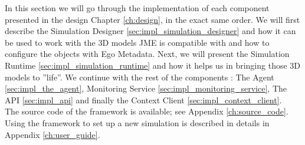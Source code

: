 In this section we will go through the implementation of each component presented in the design Chapter \ref{ch:design}, in the exact same order. We will first describe the Simulation Designer \ref{sec:impl_simulation_designer} and how it can be used to work with the 3D models JME is compatible with and how to configure the objects with Ego Metadata. Next, we will present the Simulation Runtime \ref{sec:impl_simulation_runtime} and how it helps us in bringing those 3D models to ''life''. We continue with the rest of the components : The Agent \ref{sec:impl_the_agent}, Monitoring Service \ref{sec:impl_monitoring_service}, The API \ref{sec:impl_api} and finally the Context Client \ref{sec:impl_context_client}.\\

The source code of the framework is available; see Appendix \ref{ch:source_code}. Using the framework to set up a new simulation is described in details in Appendix \ref{ch:user_guide}.\\












